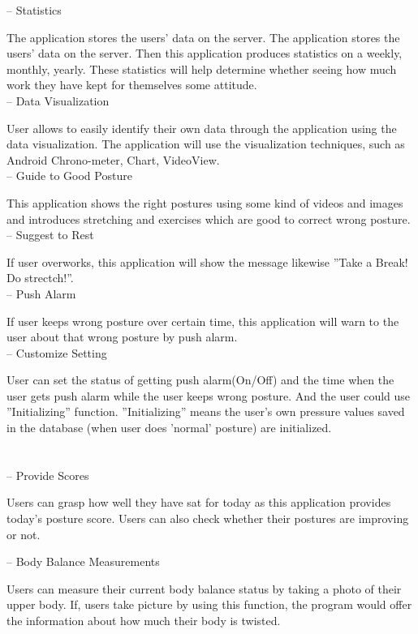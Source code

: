 \documentclass[conference]{IEEEtran}
\begin{document}
-- Statistics

The application stores the users' data on the server. The application stores the users' data on the server. Then this application produces statistics on a weekly, monthly, yearly. These statistics will help determine whether seeing how much work they have kept for themselves some attitude.\\

-- Data Visualization

User allows to easily identify their own data through the application using the data visualization. The application will use the visualization techniques, such as Android Chrono-meter, Chart, VideoView.\\

-- Guide to Good Posture

This application shows the right postures using some kind of videos and images and introduces stretching and exercises which are good to correct wrong posture.\\

-- Suggest to Rest

If user overworks, this application will show the message likewise ''Take a Break! Do strectch!''.\\

-- Push Alarm

If user keeps wrong posture over certain time, this application will warn to the user about that wrong posture by push alarm.\\

-- Customize Setting

User can set the status of getting push alarm(On/Off) and the time when the user gets push alarm while the user keeps wrong posture. And the user could use ''Initializing'' function. ''Initializing'' means the user's own pressure values saved in the database (when user does 'normal' posture) are initialized.\\\\\\

-- Provide Scores

Users can grasp how well they have sat for today as this application provides today's posture score. Users can also check whether their postures are improving or not.

-- Body Balance Measurements

Users can measure their current body balance status by taking a photo of their upper body. If, users take picture by using this function, the program would offer the information about how much their body is twisted. 
\end{document}
